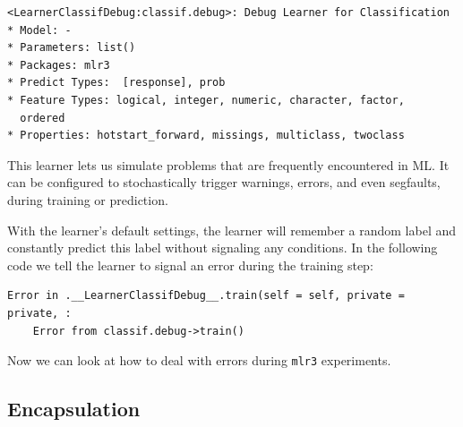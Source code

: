 \begin{Shaded}
\begin{Highlighting}[]
\OtherTok{=} \NormalTok{(}\NormalTok{)}
\OtherTok{=} \NormalTok{(}\NormalTok{)}
\end{Highlighting}
\end{Shaded}

\begin{verbatim}
<LearnerClassifDebug:classif.debug>: Debug Learner for Classification
* Model: -
* Parameters: list()
* Packages: mlr3
* Predict Types:  [response], prob
* Feature Types: logical, integer, numeric, character, factor,
  ordered
* Properties: hotstart_forward, missings, multiclass, twoclass
\end{verbatim}

This learner lets us simulate problems that are frequently encountered
in ML. It can be configured to stochastically trigger warnings, errors,
and even segfaults, during training or prediction.

With the learner's default settings, the learner will remember a random
label and constantly predict this label without signaling any
conditions. In the following code we tell the learner to signal an error
during the training step:

\begin{Shaded}
\begin{Highlighting}[]
\SpecialCharTok{$}\SpecialCharTok{$}\SpecialCharTok{$}\OtherTok{=} 
\SpecialCharTok{$}
\end{Highlighting}
\end{Shaded}

\begin{verbatim}
Error in .__LearnerClassifDebug__.train(self = self, private = private, :
	Error from classif.debug->train()
\end{verbatim}

Now we can look at how to deal with errors during \texttt{mlr3}
experiments.

\hypertarget{sec-encapsulation}{%
\subsection{\texorpdfstring{Encapsulation}{Encapsulation}}\label{sec-encapsulation}}

